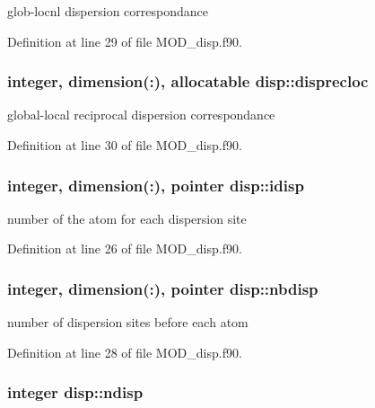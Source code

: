 glob-\/locnl dispersion correspondance 



Definition at line 29 of file M\-O\-D\-\_\-disp.\-f90.

\hypertarget{classdisp_a0866d52611a6e50459bf96953cc78fb4}{
\subsubsection[{disprecloc}]{\setlength{\rightskip}{0pt plus 5cm}integer, dimension(\-:), allocatable disp\-::disprecloc}}\label{classdisp_a0866d52611a6e50459bf96953cc78fb4}


global-\/local reciprocal dispersion correspondance 



Definition at line 30 of file M\-O\-D\-\_\-disp.\-f90.

\hypertarget{classdisp_ad3a93472ef6cc24709220caea547db6f}{
\subsubsection[{idisp}]{\setlength{\rightskip}{0pt plus 5cm}integer, dimension(\-:), pointer disp\-::idisp}}\label{classdisp_ad3a93472ef6cc24709220caea547db6f}


number of the atom for each dispersion site 



Definition at line 26 of file M\-O\-D\-\_\-disp.\-f90.

\hypertarget{classdisp_a37d2da77942166e101d189c2ee6b4f8d}{
\subsubsection[{nbdisp}]{\setlength{\rightskip}{0pt plus 5cm}integer, dimension(\-:), pointer disp\-::nbdisp}}\label{classdisp_a37d2da77942166e101d189c2ee6b4f8d}


number of dispersion sites before each atom 



Definition at line 28 of file M\-O\-D\-\_\-disp.\-f90.

\hypertarget{classdisp_a8bb0c7e5f4a883db33504183c37029c2}{
\subsubsection[{ndisp}]{\setlength{\rightskip}{0pt plus 5cm}integer disp\-::ndisp}}\label{classdisp_a8bb0c7e5f4a883db33504183c37029c2}



